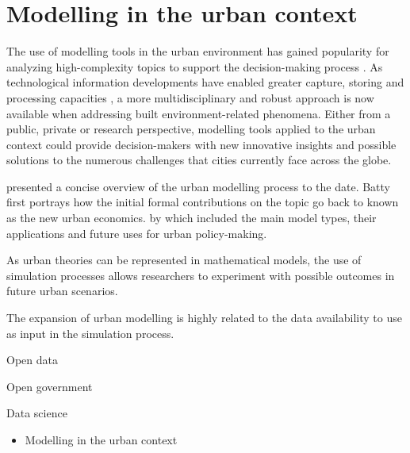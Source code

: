 \documentclass[12pt, a4paper]{report}
\begin{document}
\section{Modelling in the urban context}

The use of modelling tools in the urban environment has gained popularity for analyzing high-complexity topics to support the decision-making process \citep{houApproachBuildingOccupancy2020}. As technological information developments have enabled greater capture, storing and processing capacities \citep{krainesIntegratingDistributedComputational2011}, a more multidisciplinary and robust approach is now available when addressing built environment-related phenomena. Either from a public, private or research perspective, modelling tools applied to the urban context could provide decision-makers with new innovative insights and possible solutions to the numerous challenges that cities currently face across the globe.

\cite{battyUrbanModeling2009a} presented a concise overview of the urban modelling process to the date. Batty first portrays how the initial formal contributions on the topic go back to  known as the new urban economics.  by  which included the main model types, their applications and future uses for urban policy-making. 

As urban theories can be represented in mathematical models, the use of simulation processes allows researchers to experiment with possible outcomes in future urban scenarios.


The expansion of urban modelling is highly related to the data availability to use as input in the simulation process. 



Open data

Open government

Data science

\begin{itemize}
  \item Modelling in the urban context
\end{itemize}
\end{document}
